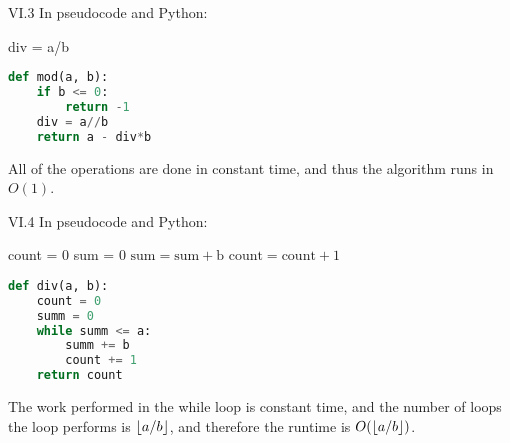 \begin{problem}{VI.3} In pseudocode and Python:


\begin{algorithmic}[0]
 
\EndIf
      \State div = a/b
  \EndFunction
\end{algorithmic}

\begin{lstlisting}[language=Python]
def mod(a, b):
	if b <= 0:
		return -1
	div = a//b
	return a - div*b
\end{lstlisting}
All of the operations are done in constant time, and thus the algorithm runs in $O(1)$.


\end{problem}


\begin{problem}{VI.4} In pseudocode and Python:


\begin{algorithmic}[0]
\State count = 0
\State sum = 0
      \State $\text{sum} = \text{sum}+ \text{b}$
      \State $\text{count} = \text{count}+ \text{1}$
    \EndWhile
  \EndFunction
\end{algorithmic}

\begin{lstlisting}[language=Python]
def div(a, b):
	count = 0
	summ = 0
	while summ <= a:
		summ += b
		count += 1
	return count
\end{lstlisting}
The work performed in the while loop is constant time, and the number of loops the loop performs is $\lfloor a/b\rfloor$, and therefore the runtime is $O(\lfloor a/b\rfloor)$.


\end{problem}




